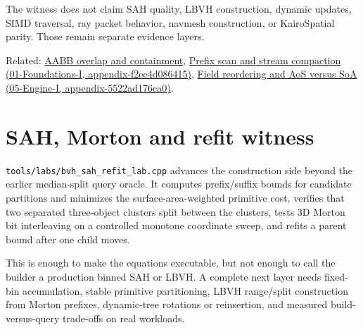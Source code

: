The witness does not claim SAH quality, LBVH construction, dynamic updates, SIMD traversal, ray packet behavior, navmesh construction, or KairoSpatial parity. Those remain separate evidence layers.

Related: \href{Continuous\%20Notes/University\%20-\%20Worlds,\%20Images\%20and\%20Inference\%20-\%20Graphics,\%20Vision\%20and\%20Photography\#Axis-Aligned\%20Bounding\%20Boxes}{AABB overlap and containment}, \href{../01-Foundations-I/main.pdf\#nameddest=appendix-f2ee4d086415}{Prefix scan and stream compaction (01-Foundations-I, appendix-f2ee4d086415)}, \href{../05-Engine-I/main.pdf\#nameddest=appendix-5522ad176ca0}{Field reordering and AoS versus SoA (05-Engine-I, appendix-5522ad176ca0)}.

\section{SAH, Morton and refit witness}\label{appendix-5653a7aea6bb-sah-morton-and-refit-witness}

\texttt{tools/labs/bvh\_sah\_refit\_lab.cpp} advances the construction side beyond the earlier median-split query oracle. It computes prefix/suffix bounds for candidate partitions and minimizes the surface-area-weighted primitive cost, verifies that two separated three-object clusters split between the clusters, tests 3D Morton bit interleaving on a controlled monotone coordinate sweep, and refits a parent bound after one child moves.

This is enough to make the equations executable, but not enough to call the builder a production binned SAH or LBVH. A complete next layer needs fixed-bin accumulation, stable primitive partitioning, LBVH range/split construction from Morton prefixes, dynamic-tree rotations or reinsertion, and measured build-versus-query trade-offs on real workloads.

